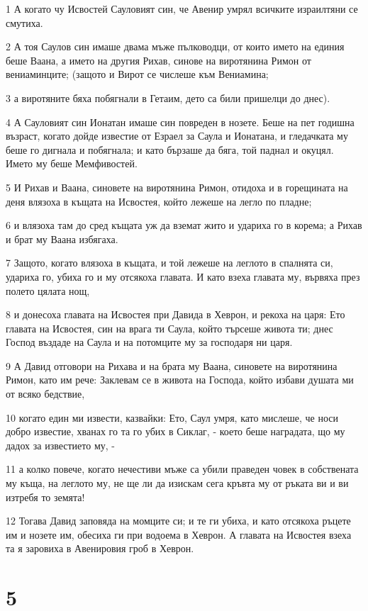 \par 1 А когато чу Исвостей Сауловият син, че Авенир умрял всичките израилтяни се смутиха.
\par 2 А тоя Саулов син имаше двама мъже пълководци, от които името на единия беше Ваана, а името на другия Рихав, синове на виротянина Римон от вениаминците; (защото и Вирот се числеше към Вениамина;
\par 3 а виротяните бяха побягнали в Гетаим, дето са били пришелци до днес).
\par 4 А Сауловият син Ионатан имаше син повреден в нозете. Беше на пет годишна възраст, когато дойде известие от Езраел за Саула и Ионатана, и гледачката му беше го дигнала и побягнала; и като бързаше да бяга, той паднал и окуцял. Името му беше Мемфивостей.
\par 5 И Рихав и Ваана, синовете на виротянина Римон, отидоха и в горещината на деня влязоха в къщата на Исвостея, който лежеше на легло по пладне;
\par 6 и влязоха там до сред къщата уж да вземат жито и удариха го в корема; а Рихав и брат му Ваана избягаха.
\par 7 Защото, когато влязоха в къщата, и той лежеше на леглото в спалнята си, удариха го, убиха го и му отсякоха главата. И като взеха главата му, вървяха през полето цялата нощ,
\par 8 и донесоха главата на Исвостея при Давида в Хеврон, и рекоха на царя: Ето главата на Исвостея, син на врага ти Саула, който търсеше живота ти; днес Господ въздаде на Саула и на потомците му за господаря ни царя.
\par 9 А Давид отговори на Рихава и на брата му Ваана, синовете на виротянина Римон, като им рече: Заклевам се в живота на Господа, който избави душата ми от всяко бедствие,
\par 10 когато един ми извести, казвайки: Ето, Саул умря, като мислеше, че носи добро известие, хванах го та го убих в Сиклаг, - което беше наградата, що му дадох за известието му, -
\par 11 а колко повече, когато нечестиви мъже са убили праведен човек в собствената му къща, на леглото му, не ще ли да изискам сега кръвта му от ръката ви и ви изтребя то земята!
\par 12 Тогава Давид заповяда на момците си; и те ги убиха, и като отсякоха ръцете им и нозете им, обесиха ги при водоема в Хеврон. А главата на Исвостея взеха та я заровиха в Авенировия гроб в Хеврон.

\chapter{5}

